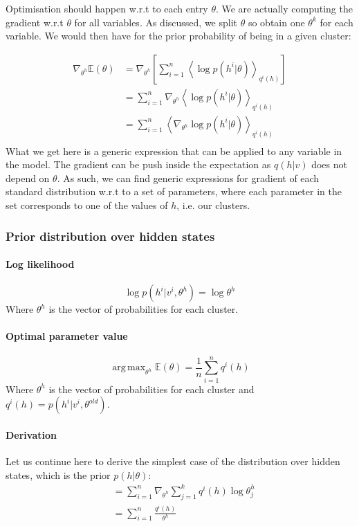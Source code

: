 \documentclass[]{article}
\DeclareMathOperator*{\argmax}{arg\,max}
\begin{document}
Optimisation should happen w.r.t to each entry $\theta$. We are actually computing the gradient w.r.t $\theta$ for all variables. As discussed, we split $\theta$ so obtain one $\theta^k$ for each variable. We would then have for the prior probability of being in a given cluster:

\begin{align*}
	\nabla_{\theta^h} \mathbb{E}(\theta) &= \nabla_{\theta^h} \left[ \sum_{i=1}^{n} \left\langle \log p(h^i|\theta) \right\rangle_{q^i(h)} \right] \\
	&= \sum_{i=1}^{n} \nabla_{\theta^h} \left\langle  \log p(h^i|\theta) \right\rangle_{q^i(h)} \\
	&= \sum_{i=1}^{n} \left\langle \nabla_{\theta^h} \log p(h^i|\theta) \right\rangle_{q^i(h)} \\
\end{align*}
What we get here is a generic expression that can be applied to any variable in the model. The gradient can be push inside the expectation as $q(h|v)$ does not depend on $\theta$. As such, we can find generic expressions for gradient of each standard distribution w.r.t to a set of parameters, where each parameter in the set corresponds to one of the values of $h$, i.e. our clusters. 

\subsubsection{Prior distribution over hidden states}
\paragraph{Log likelihood}
\[
	\log p(h^i|v^i, \theta^h) = \log \theta^h
\]
Where $\theta^h$ is the vector of probabilities for each cluster.
\paragraph{Optimal parameter value}
\[
	\argmax_{\theta^h} \mathbb{E}(\theta) = \frac{1}{n} \sum_{i=1}^{n} q^i(h)
\]
Where $\theta^h$ is the vector of probabilities for each cluster and $q^i(h) = p(h^i|v^i, \theta^{old})$.
\paragraph{Derivation}

Let us continue here to derive the simplest case of the distribution over hidden states, which is the prior $p(h|\theta)$:
\begin{align*}
	&= \sum_{i=1}^{n} \nabla_{\theta^h}  \sum_{j=1}^{k} q^i(h) \log \theta^h_j  \\
	&= \sum_{i=1}^{n}  \frac{q^i(h)}{\theta^h} \\	
\end{align*}
\end{document}
